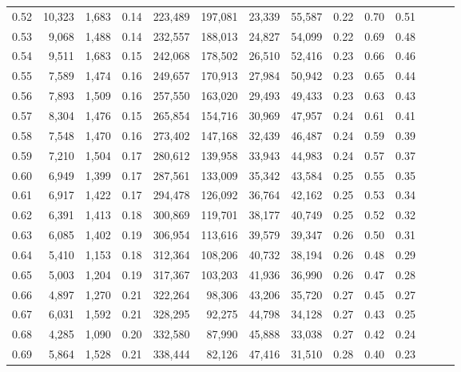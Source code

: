 \begin{tabular}{rrrrrrrrrrrrrr}
0.52 &  10,323 &  1,683 &  0.14 &  223,489 &  197,081 &  23,339 &  55,587 &  0.22 &  0.70 &      0.51 \\
0.53 &   9,068 &  1,488 &  0.14 &  232,557 &  188,013 &  24,827 &  54,099 &  0.22 &  0.69 &      0.48 \\
0.54 &   9,511 &  1,683 &  0.15 &  242,068 &  178,502 &  26,510 &  52,416 &  0.23 &  0.66 &      0.46 \\
0.55 &   7,589 &  1,474 &  0.16 &  249,657 &  170,913 &  27,984 &  50,942 &  0.23 &  0.65 &      0.44 \\
0.56 &   7,893 &  1,509 &  0.16 &  257,550 &  163,020 &  29,493 &  49,433 &  0.23 &  0.63 &      0.43 \\
0.57 &   8,304 &  1,476 &  0.15 &  265,854 &  154,716 &  30,969 &  47,957 &  0.24 &  0.61 &      0.41 \\
0.58 &   7,548 &  1,470 &  0.16 &  273,402 &  147,168 &  32,439 &  46,487 &  0.24 &  0.59 &      0.39 \\
0.59 &   7,210 &  1,504 &  0.17 &  280,612 &  139,958 &  33,943 &  44,983 &  0.24 &  0.57 &      0.37 \\
0.60 &   6,949 &  1,399 &  0.17 &  287,561 &  133,009 &  35,342 &  43,584 &  0.25 &  0.55 &      0.35 \\
0.61 &   6,917 &  1,422 &  0.17 &  294,478 &  126,092 &  36,764 &  42,162 &  0.25 &  0.53 &      0.34 \\
0.62 &   6,391 &  1,413 &  0.18 &  300,869 &  119,701 &  38,177 &  40,749 &  0.25 &  0.52 &      0.32 \\
0.63 &   6,085 &  1,402 &  0.19 &  306,954 &  113,616 &  39,579 &  39,347 &  0.26 &  0.50 &      0.31 \\
0.64 &   5,410 &  1,153 &  0.18 &  312,364 &  108,206 &  40,732 &  38,194 &  0.26 &  0.48 &      0.29 \\
0.65 &   5,003 &  1,204 &  0.19 &  317,367 &  103,203 &  41,936 &  36,990 &  0.26 &  0.47 &      0.28 \\
0.66 &   4,897 &  1,270 &  0.21 &  322,264 &   98,306 &  43,206 &  35,720 &  0.27 &  0.45 &      0.27 \\
0.67 &   6,031 &  1,592 &  0.21 &  328,295 &   92,275 &  44,798 &  34,128 &  0.27 &  0.43 &      0.25 \\
0.68 &   4,285 &  1,090 &  0.20 &  332,580 &   87,990 &  45,888 &  33,038 &  0.27 &  0.42 &      0.24 \\
0.69 &   5,864 &  1,528 &  0.21 &  338,444 &   82,126 &  47,416 &  31,510 &  0.28 &  0.40 &      0.23 \\

\end{tabular}
